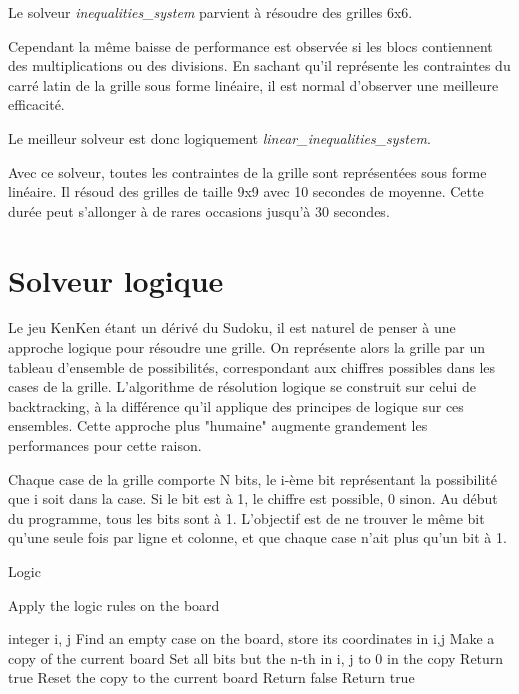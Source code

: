 \documentclass[1]{report}
\begin{document}
\begin{itemize}
        Le solveur \textit{inequalities\_system} parvient à résoudre des grilles 6x6. 
        
        Cependant la même baisse de performance est observée si les blocs contiennent des multiplications ou des divisions. En sachant qu'il représente les contraintes du carré latin de la grille sous forme linéaire, il est normal d'observer une meilleure efficacité. \newline
        
        Le meilleur solveur est donc logiquement \textit{linear\_inequalities\_system}. 
        
        Avec ce solveur, toutes les contraintes de la grille sont représentées sous forme linéaire. Il résoud des grilles de taille 9x9 avec 10 secondes de moyenne. Cette durée peut s'allonger à de rares occasions jusqu'à 30 secondes.
    
    \end{itemize}

\section{Solveur logique}

Le jeu KenKen étant un dérivé du Sudoku, il est naturel de penser à une approche logique pour résoudre une grille. On représente alors la grille par un tableau d'ensemble de possibilités, correspondant aux chiffres possibles dans les cases de la grille. L'algorithme de résolution logique se construit sur celui de backtracking, à la différence qu'il applique des principes de logique sur ces ensembles. Cette approche plus "humaine" augmente grandement les performances pour cette raison.\par
Chaque case de la grille comporte N bits, le i-ème bit représentant la possibilité que i soit dans la case. Si le bit est à 1, le chiffre est possible, 0 sinon. Au début du programme, tous les bits sont à 1. L'objectif est de ne trouver le m\^eme bit qu'une seule fois par ligne et colonne, et que chaque case n'ait plus qu'un bit à 1.

\begin{algorithm}[H]
\caption{Logic}
\begin{algorithmic}[1]
\STATE Apply the logic rules on the board
\ENDWHILE

\STATE integer i, j
\STATE Find an empty case on the board, store its coordinates in i,j
\STATE Make a copy of the current board
\STATE Set all bits but the n-th in i, j to 0 in the copy
\STATE Return true
\ELSE
\STATE Reset the copy to the current board
\ENDIF
\ENDIF
\ENDFOR
\ENDIF
\STATE Return false
\ENDIF
\STATE Return true

\end{algorithmic}
\end{algorithm}
\end{document}
